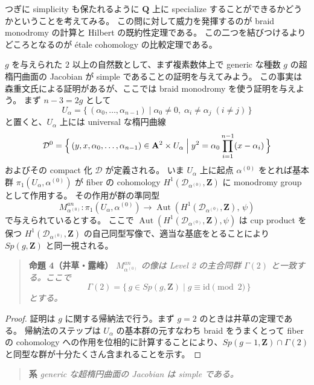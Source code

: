 \documentclass[uplatex,dvipdfmx]{jlreq}
\def\Aut{\operatorname{Aut}}
\begin{document}
つぎに simplicity も保たれるように $\mathbf{Q}$ 上に specialize することができるかどうかということを考えてみる。
この問に対して威力を発揮するのが braid monodromy の計算と Hilbert の既約性定理である。
この二つを結びつけるよりどころとなるのが étale cohomology の比較定理である。

$g$ を与えられた $2$ 以上の自然数として、まず複素数体上で generic な種数 $g$ の超楕円曲面の Jacobian が simple であることの証明を与えてみよう。
この事実は森重文氏による証明があるが、ここでは braid monodromy を使う証明を与えよう。
まず $n - 3 = 2g$ として
\[
  U_{\alpha} = \bigl\{\, (\alpha_0, \dots, \alpha_{n-1}) \mid \alpha_0 \neq 0,\; \alpha_i \neq \alpha_j \; (i \neq j) \,\bigr\}
\]
と置くと、$U_{\alpha}$ 上には universal な楕円曲線
\[
  \mathcal{D}^0 = \Bigl\{\, (y, x, \alpha_0, \dots, \alpha_{n-1}) \in \mathbf{A}^2 \times U_{\alpha} \Bigm| y^2 = \alpha_0 \prod_{i=1}^{n-1}(x - \alpha_i) \,\Bigr\}
\]
およびその compact 化 $\mathcal{D}$ が定義される。
いま $U_{\alpha}$ 上に起点 $\alpha^{(0)}$ をとれば基本群 $\pi_1(U_{\alpha}, \alpha^{(0)})$ が fiber の cohomology $H^1(\mathcal{D}_{\alpha^{(0)}}, \mathbf{Z})$ に monodromy group として作用する。
その作用が群の準同型
\[
  M_{\alpha^{(0)}}^{an} : \pi_1(U_{\alpha}, \alpha^{(0)}) \to \Aut(H^1(\mathcal{D}_{\alpha^{(0)}}, \mathbf{Z}),\, \psi)
\]
で与えられているとする。
ここで $\Aut(H^1(\mathcal{D}_{\alpha^{(0)}}, \mathbf{Z}), \psi)$ は cup product を保つ $H^1(\mathcal{D}_{\alpha^{(0)}}, \mathbf{Z})$ の自己同型写像で、適当な基底をとることにより $Sp(g, \mathbf{Z})$ と同一視される。

\begin{quote}
\textbf{命題 4（井草・露峰）}\quad
\textit{$M_{\alpha^{(0)}}^{an}$ の像は Level 2 の主合同群 $\Gamma(2)$ と一致する。ここで
\[
  \Gamma(2) = \{\, g \in Sp(g, \mathbf{Z}) \mid g \equiv \mathrm{id} \pmod{2} \,\}
\]
とする。}
\end{quote}

\begin{proof}
証明は $g$ に関する帰納法で行う。まず $g = 2$ のときは井草の定理である。
帰納法のステップは $U_{\alpha}$ の基本群の元すなわち braid をうまくとって fiber の cohomology への作用を位相的に計算することにより、$Sp(g-1, \mathbf{Z}) \cap \Gamma(2)$ と同型な群が十分たくさん含まれることを示す。
\end{proof}

\begin{quote}
\textbf{系}\quad
\textit{generic な超楕円曲面の Jacobian は simple である。}
\end{quote}
\end{document}
